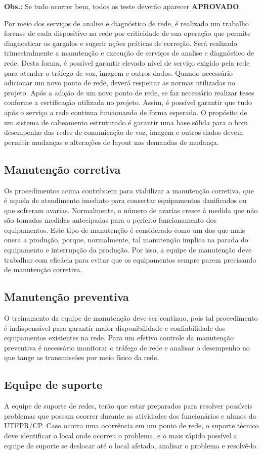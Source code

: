 \documentclass[	DIV=calc,%
paper=a4,%
fontsize=12pt,%
onecolumn]{scrartcl}	 					%
\begin{document}
	\textbf{Obs.:} Se tudo ocorrer bem, todos os teste deverão aparecer \textbf{APROVADO}.
	
	Por meio dos serviços de analise e diagnóstico de rede, é realizado um trabalho forense de cada dispositivo na rede por criticidade de sua operação que permite diagnosticar os gargalos e sugerir ações práticas de correção.
	Será realizado trimestralmente a manutenção e execução de serviços de analise e diagnóstico de rede. Desta forma, é possível garantir elevado nível de serviço exigido pela rede para atender o tráfego de voz, imagem e outros dados.
	Quando necessário adicionar um novo ponto de rede, deverá respeitar as normas utilizadas no projeto. Após a adição de um novo ponto de rede, se faz necessário realizar teses conforme a certificação utilizada no projeto. Assim, é possível garantir que tudo após o serviço a rede continua funcionando de forma esperada.
	O propósito de um sistema de cabeamento estruturado é garantir uma base sólida para o bom desempenho das redes de comunicação de voz, imagem e outros dados devem permitir mudanças e alterações de layout nas demandas de mudança.
	\subsection{Manutenção corretiva}
	Os procedimentos acima contribuem para viabilizar a manutenção corretiva, que é aquela de atendimento imediato para consertar equipamentos danificados ou que sofreram avarias. Normalmente, o número de avarias cresce à medida que não são tomadas medidas antecipadas para o perfeito funcionamento dos equipamentos.
	Este tipo de manutenção é considerado como um dos que mais onera a produção, porque, normalmente, tal manutenção implica na parada do equipamento e interrupção da produção. Por isso, a equipe de manutenção deve trabalhar com eficácia para evitar que os equipamentos sempre parem precisando de manutenção corretiva.
	\subsection{Manutenção preventiva}
	O treinamento da equipe de manutenção deve ser contínuo, pois tal procedimento é indispensável para garantir maior disponibilidade e confiabilidade dos equipamentos existentes na rede. Para um efetivo controle da manutenção preventiva é necessário monitorar o tráfego de rede e analisar o desempenho no que tange as transmissões por meio físico da rede. 
	
	\subsection{Equipe de suporte}
	A equipe de suporte de redes, terão que estar preparados para resolver possíveis problemas que possam ocorrer durante as atividades dos funcionários e alunos da UTFPR/CP. Caso ocorra uma ocorrência em um ponto de rede, o suporte técnico deve identificar o local onde ocorreu o problema, e o mais rápido possível a equipe de suporte se deslocar até o local afetado, analisar o problema e resolvê-lo.
	
\end{document}
